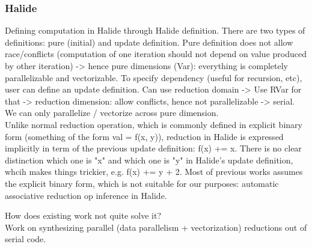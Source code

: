 \subsubsection{Halide}

Defining computation in Halide through Halide definition. There are two types of definitions: pure (initial) and update definition. Pure definition does not allow race/conflicts (computation of one iteration should not depend on value produced by other iteration) -> hence pure dimensions (Var):  everything is completely parallelizable and vectorizable. To specify dependency (useful for recursion, etc), user can define an update definition. Can use reduction domain -> Use RVar for that -> reduction dimension: allow conflicts, hence not parallelizable -> serial. We can only parallelize / vectorize across pure dimension. \\

Unlike normal reduction operation, which is commonly defined in explicit binary form (something of the form val = f(x, y)), reduction in Halide is expressed implicitly in term of the previous update definition: f(x) += x. There is no clear distinction which one is "x" and which one is "y" in Halide's update definition, whcih makes things trickier, e.g. f(x) += y + 2. Most of previous works assumes the explicit binary form, which is not suitable for our purposes: automatic associative reduction op inference in Halide.	

How does existing work not quite solve it? \\

Work on synthesizing parallel (data parallelism + vectorization) reductions out of serial code. \\

